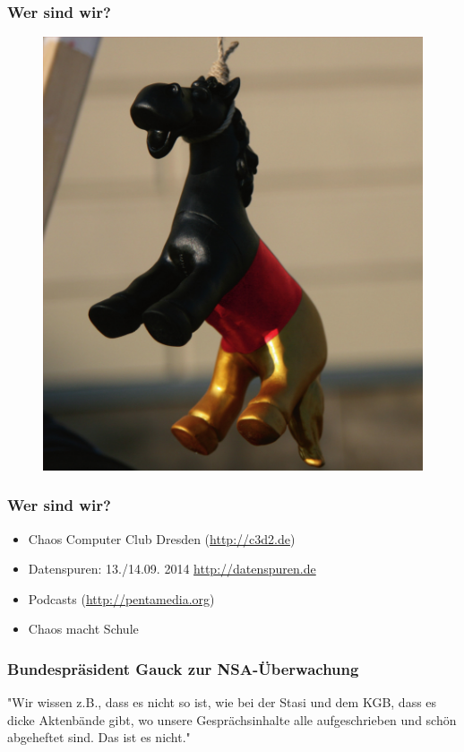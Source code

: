 \documentclass[12pt]{beamer}
\begin{document}
\begin{frame}
  \frametitle{Wer sind wir?}
  \begin{figure}
    \includegraphics[height=0.7\textheight]{img/trojaner.jpg}
  \end{figure}
\end{frame}

\begin{frame}
    \frametitle{Wer sind wir?}
    \begin{itemize}
      \item<1-> Chaos Computer Club Dresden (\url{http://c3d2.de})
          \note{}
      \item<2-> Datenspuren: 13./14.09. 2014 \url{http://datenspuren.de}
      \item<3-> Podcasts (\url{http://pentamedia.org})
      \item<4-> Chaos macht Schule
    \end{itemize}
\end{frame}

\begin{frame}
    \frametitle{Bundespräsident Gauck zur NSA-Überwachung}
    \begin{center}
      "Wir wissen z.B., dass es nicht so ist, wie bei der Stasi und dem KGB, dass es dicke Aktenbände gibt, wo unsere Gesprächsinhalte alle aufgeschrieben und schön abgeheftet sind. Das ist es nicht."
      \end{center}
\end{frame}
\end{document}
